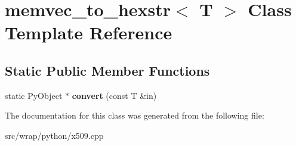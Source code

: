 \hypertarget{classmemvec__to__hexstr}{\section{memvec\-\_\-to\-\_\-hexstr$<$ T $>$ Class Template Reference}
\label{classmemvec__to__hexstr}
}
\subsection*{Static Public Member Functions}
\begin{DoxyCompactItemize}
\item 
\hypertarget{classmemvec__to__hexstr_a8511c5fdbcb5cfe1ba4781f62bdf9daf}{static Py\-Object $\ast$ {\bfseries convert} (const T \&in)}\label{classmemvec__to__hexstr_a8511c5fdbcb5cfe1ba4781f62bdf9daf}

\end{DoxyCompactItemize}


The documentation for this class was generated from the following file\-:\begin{DoxyCompactItemize}
\item 
src/wrap/python/x509.\-cpp\end{DoxyCompactItemize}
